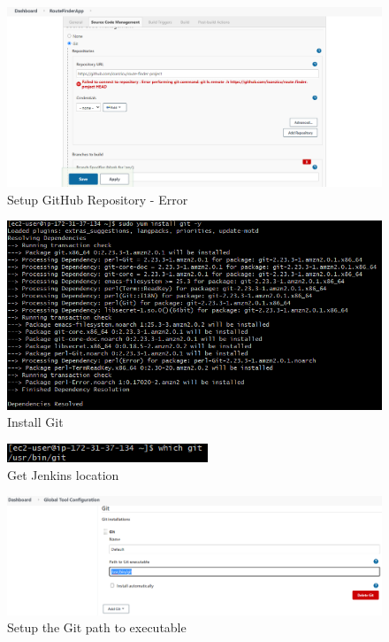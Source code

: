 \documentclass[12pt,a4paper,twoside]{article}
\begin{document}
\begin{figure}[h!]
    \centering
        \includegraphics[width=15cm]{images-aws/32-jenkins-setup-repo.png}
        \caption{Setup GitHub Repository - Error}
\end{figure}


\begin{figure}[h!]
    \centering
        \includegraphics[width=15cm]{images-aws/33-jenkins-install-git.png}
        \caption{Install Git}
\end{figure}


\begin{figure}[h!]
    \centering
        \includegraphics[width=6cm]{images-aws/34-jenkins-git-on-local.png}
        \caption{Get Jenkins location}
\end{figure}


\begin{figure}[h!]
    \centering
        \includegraphics[width=15cm]{images-aws/36-jenkins-git-set-path.png}
        \caption{Setup the Git path to executable}
\end{figure}
\end{document}
